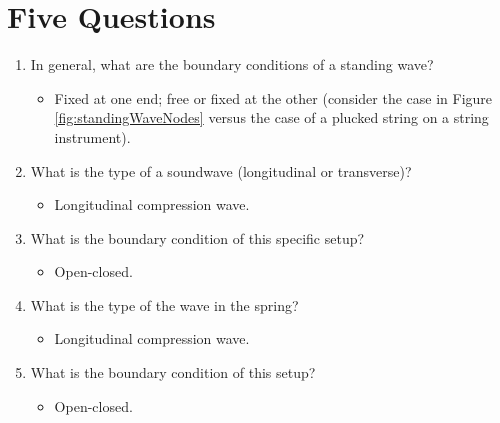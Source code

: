 \documentclass{article}
\begin{document}
\section{Five Questions}
\begin{enumerate}
    \item In general, what are the boundary conditions of a standing wave?
    \begin{itemize}[label={--}]
        \item Fixed at one end; free or fixed at the other (consider the case in Figure \ref{fig:standingWaveNodes} versus the case of a plucked string on a string instrument).
    \end{itemize}
    \item What is the type of a soundwave (longitudinal or transverse)?
    \begin{itemize}[label={--}]
        \item Longitudinal compression wave.
    \end{itemize}
    \item What is the boundary condition of this specific setup?
    \begin{itemize}[label={--}]
        \item Open-closed.
    \end{itemize}
    \item What is the type of the wave in the spring?
    \begin{itemize}[label={--}]
        \item Longitudinal compression wave.
    \end{itemize}
    \item What is the boundary condition of this setup?
    \begin{itemize}[label={--}]
        \item Open-closed.
    \end{itemize}
\end{enumerate}
\end{document}
